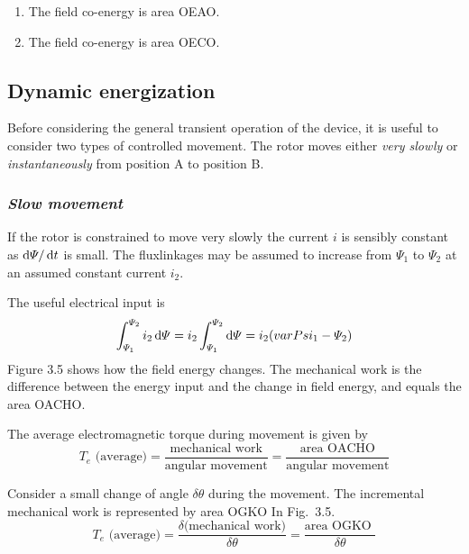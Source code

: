 \documentclass[a4paper,numbers=noenddot,12pt]{scrbook}
\begin{document}
            \begin{enumerate}[label={Position \Alph*:},leftmargin=3cm]
                \item The field co-energy is area OEAO.\@
                \item The field co-energy is area OECO.\@
            \end{enumerate}

            \subsection{Dynamic energization}
            Before considering the general transient operation of the device, it is useful to consider two types of controlled movement. The rotor moves either \textit{very slowly} or \textit{instantaneously} from position A to position B. 
            \subsubsection{\textit{Slow movement}}
            If the rotor is constrained to move very slowly the current $i$ is sensibly constant as $\dif \varPsi / \dif t$ is small. The flux­linkages may be assumed to increase from $\varPsi_1$ to $\varPsi_2$ at an assumed constant current $i_2$.

            The useful electrical input is 
            \begin{equation}
                \int_{\varPsi_1}^{\varPsi_2} i_2 \dif \varPsi = i_2  \int_{\varPsi_1}^{\varPsi_2} \dif \varPsi =  i_2 (varPsi_1 -\varPsi_2)
                \label{eq:Eq3.15}
            \end{equation}
            Figure 3.5 shows how the field energy changes. The mechanical work is the difference between the energy input and the change in field energy, and equals the area OACHO.\@

            The average electromagnetic torque during movement is given by 
            \begin{equation}
                T_e \text{\ (average)} = \dfrac{\text{mechanical work}}{\text{angular movement}} = \dfrac{\text{area OACHO}}{\text{angular movement}}
                \label{eq:Eq3.16}
            \end{equation}

            Consider a small change of angle $\delta \theta$ during the movement. The incremental mechanical work is represented by area OGKO In Fig.\ 3.5.
            \begin{equation}
                T_e \text{\ (average)}=\dfrac{\delta\text{(mechanical work)}}{\delta \theta} = \dfrac{\text{area OGKO }}{\delta\theta}
                \label{eq:Eq3.17}
            \end{equation}
\end{document}
